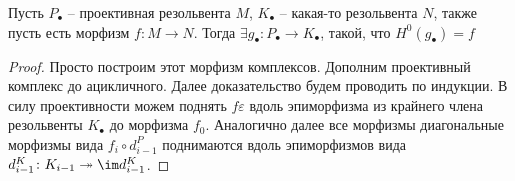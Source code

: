 \documentclass[../main.tex]{subfiles}
\begin{document}
\begin{to_lem}
    Пусть $P_\bullet$ -- проективная резольвента $M$, $K_\bullet$ -- какая-то резольвента $N$, также пусть есть морфизм $f \colon M \to N$. Тогда $\exists g_\bullet\colon P_\bullet\to K_\bullet$, такой, что $H^0(g_\bullet) = f$
\end{to_lem}
\begin{proof}
    Просто построим этот морфизм комплексов. Дополним проективный комплекс до ацикличного. Далее доказательство будем проводить по индукции.  В силу проективности можем поднять $f\varepsilon$ вдоль эпиморфизма из крайнего члена резольвенты $K_\bullet$ до морфизма $f_0$. Аналогично далее все морфизмы диагональные морфизмы вида $f_i\circ d_{i-1}^P$ поднимаются вдоль эпиморфизмов вида $d_{i-1}^K\colon K_{i-1}\twoheadrightarrow \im d_{i-1}^K$.
    \bee
    \eee
\end{proof} 
\end{document}
